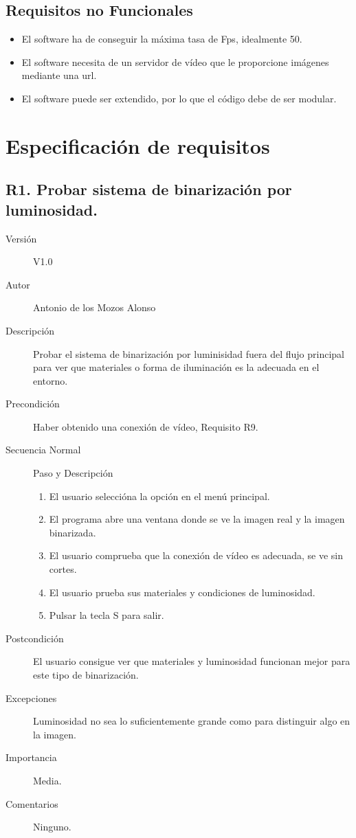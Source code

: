 \subsection{Requisitos no Funcionales}

\begin{itemize}

\item El software ha de conseguir la máxima tasa de Fps, idealmente 50.

\item El software necesita de un servidor de vídeo que le proporcione imágenes mediante una url.

\item El software puede ser extendido, por lo que el código debe de ser modular.

\end{itemize}

\section{Especificación de requisitos}

\subsection{R1. Probar sistema de binarización por luminosidad.}
\begin{description}
	\item [Versión] V1.0
	\item [Autor] Antonio de los Mozos Alonso
	\item [Descripción] Probar el sistema de binarización por luminisidad fuera del flujo principal para ver que materiales o forma de iluminación es la adecuada en el entorno.
	\item [Precondición] Haber obtenido una conexión de vídeo, Requisito R9.
	\item [Secuencia Normal] Paso y Descripción
	
		\begin{enumerate}
			\item El usuario seleccióna la opción en el menú principal.
			
			\item El programa abre una ventana donde se ve la imagen real y la imagen binarizada.			
			
			\item El usuario comprueba que la conexión de vídeo es adecuada, se ve sin cortes.
			\item El usuario prueba sus materiales y condiciones de luminosidad.
			\item Pulsar la tecla S para salir.
		\end{enumerate}
	\item [Postcondición] El usuario consigue ver que materiales y luminosidad funcionan mejor para este tipo de binarización.
	\item [Excepciones] Luminosidad no sea lo suficientemente grande como para distinguir algo en la imagen.
	\item [Importancia] Media.
	\item [Comentarios] Ninguno.
\end{description}

